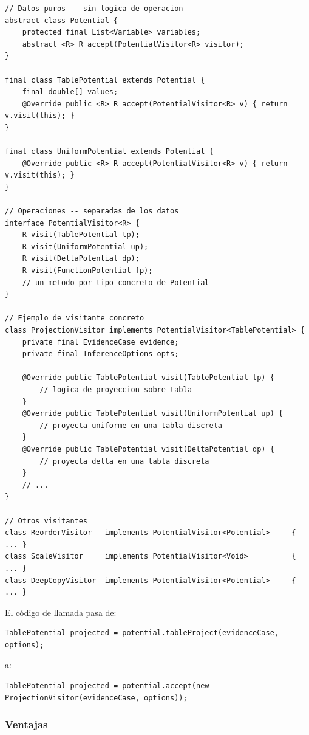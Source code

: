 \documentclass[11pt,a4paper]{article}
\begin{document}
\begin{lstlisting}[caption={Jerarquía de datos y visitantes}]
// Datos puros -- sin logica de operacion
abstract class Potential {
    protected final List<Variable> variables;
    abstract <R> R accept(PotentialVisitor<R> visitor);
}

final class TablePotential extends Potential {
    final double[] values;
    @Override public <R> R accept(PotentialVisitor<R> v) { return v.visit(this); }
}

final class UniformPotential extends Potential {
    @Override public <R> R accept(PotentialVisitor<R> v) { return v.visit(this); }
}

// Operaciones -- separadas de los datos
interface PotentialVisitor<R> {
    R visit(TablePotential tp);
    R visit(UniformPotential up);
    R visit(DeltaPotential dp);
    R visit(FunctionPotential fp);
    // un metodo por tipo concreto de Potential
}

// Ejemplo de visitante concreto
class ProjectionVisitor implements PotentialVisitor<TablePotential> {
    private final EvidenceCase evidence;
    private final InferenceOptions opts;

    @Override public TablePotential visit(TablePotential tp) {
        // logica de proyeccion sobre tabla
    }
    @Override public TablePotential visit(UniformPotential up) {
        // proyecta uniforme en una tabla discreta
    }
    @Override public TablePotential visit(DeltaPotential dp) {
        // proyecta delta en una tabla discreta
    }
    // ...
}

// Otros visitantes
class ReorderVisitor   implements PotentialVisitor<Potential>     { ... }
class ScaleVisitor     implements PotentialVisitor<Void>          { ... }
class DeepCopyVisitor  implements PotentialVisitor<Potential>     { ... }
\end{lstlisting}

El código de llamada pasa de:

\begin{lstlisting}
TablePotential projected = potential.tableProject(evidenceCase, options);
\end{lstlisting}

\noindent a:

\begin{lstlisting}
TablePotential projected = potential.accept(new ProjectionVisitor(evidenceCase, options));
\end{lstlisting}

\subsubsection*{Ventajas}
\end{document}
